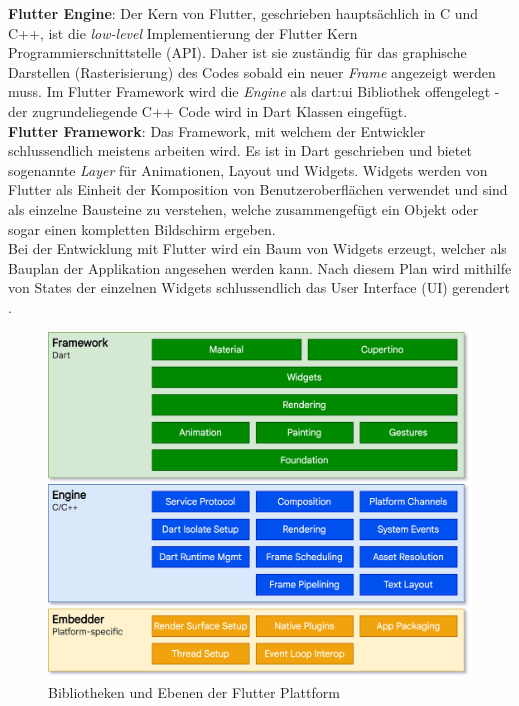 \noindent
{}
\textbf{Flutter Engine}: Der Kern von Flutter, geschrieben hauptsächlich in C und C++, ist die \textit{low-level} Implementierung der Flutter Kern Programmierschnittstelle (API). Daher ist sie zuständig für das graphische Darstellen (Rasterisierung) des Codes sobald ein neuer \textit{Frame} angezeigt werden muss. Im Flutter Framework wird die \textit{Engine} als dart:ui Bibliothek offengelegt - der zugrundeliegende C++ Code wird in Dart Klassen eingefügt.\\

\noindent
{}
\textbf{Flutter Framework}: Das Framework, mit welchem der Entwickler schlussendlich meistens arbeiten wird. Es ist in Dart geschrieben und bietet sogenannte \textit{Layer} für Animationen, Layout und Widgets. Widgets werden von Flutter als Einheit der Komposition von Benutzeroberflächen verwendet und sind als einzelne Bausteine zu verstehen, welche zusammengefügt ein Objekt oder sogar einen kompletten Bildschirm ergeben.\\

\noindent
Bei der Entwicklung mit Flutter wird ein Baum von Widgets erzeugt, welcher als Bauplan der Applikation angesehen werden kann. Nach diesem Plan wird mithilfe von States der einzelnen Widgets schlussendlich das User Interface (UI) gerendert \cite{flutter2021}.

\begin{figure}[tbt]
	\begin{center}
		\includegraphics[scale=0.25]{Theoretische_Grundlagen/images/flutter_architektur.png}
	\end{center}
	\caption[Bibliotheken und Ebenen der Flutter Plattform]{Bibliotheken und Ebenen der Flutter Plattform \protect \footnotemark}
	\label{fig:flutter_plattform}
\end{figure}

